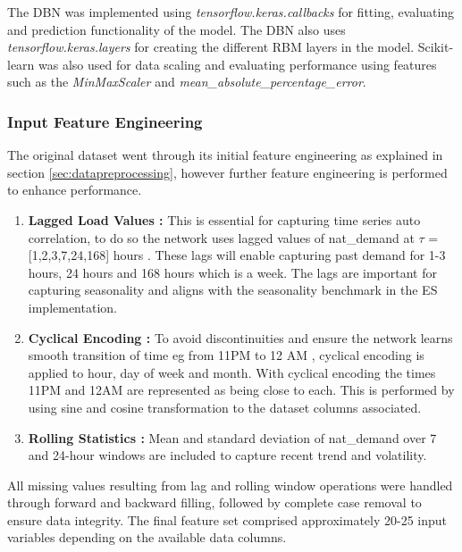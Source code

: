 The DBN was implemented using \textit{tensorflow.keras.callbacks} for fitting, evaluating and prediction functionality of the model. The DBN also uses \textit{tensorflow.keras.layers} for creating the different RBM layers in the model. Scikit-learn was also used for data scaling and evaluating performance using features such as the \textit{MinMaxScaler} and \textit{mean\_absolute\_percentage\_error}. 
\subsubsection{Input Feature Engineering}
The original dataset went through its initial feature engineering as explained in section \ref{sec:datapreprocessing}, however further feature engineering is performed to enhance performance.

\begin{enumerate}
	\item \textbf{Lagged Load Values : } This is essential for capturing time series auto correlation, to do so the network uses lagged values of nat\_demand at $\tau$ = [1,2,3,7,24,168] hours . These lags will enable capturing past demand for 1-3 hours, 24 hours and 168 hours which is a week. The lags are important for capturing seasonality and aligns with the seasonality benchmark in the ES implementation.
	\item \textbf{Cyclical Encoding : } To avoid discontinuities and ensure the network learns smooth transition of time eg from 11PM to 12 AM , cyclical encoding is applied to hour, day of week and month. With cyclical encoding the times 11PM and 12AM are represented as being close to each. This is performed by using sine and cosine transformation to the dataset columns associated.
	\item \textbf{Rolling Statistics : } Mean and standard deviation of nat\_demand over 7 and 24-hour windows are included to capture recent trend and volatility.
\end{enumerate}
All missing values resulting from lag and rolling window operations were handled through forward and backward filling, followed by complete case removal to ensure data integrity. The final feature set comprised approximately 20-25 input variables depending on the available data columns.
